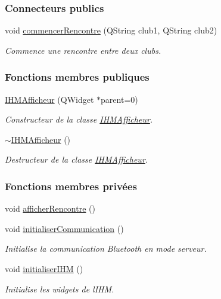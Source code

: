 \subsubsection*{Connecteurs publics}
\begin{DoxyCompactItemize}
\item 
void \hyperlink{class_i_h_m_afficheur_ad2dc0742d9cdda731a16c570fd6f2434}{commencer\+Rencontre} (Q\+String club1, Q\+String club2)
\begin{DoxyCompactList}\small\item\em Commence une rencontre entre deux clubs. \end{DoxyCompactList}\end{DoxyCompactItemize}
\subsubsection*{Fonctions membres publiques}
\begin{DoxyCompactItemize}
\item 
\hyperlink{class_i_h_m_afficheur_a2fdf6626a1d9c2c635110a6e6ab703f9}{I\+H\+M\+Afficheur} (Q\+Widget $\ast$parent=0)
\begin{DoxyCompactList}\small\item\em Constructeur de la classe \hyperlink{class_i_h_m_afficheur}{I\+H\+M\+Afficheur}. \end{DoxyCompactList}\item 
\hyperlink{class_i_h_m_afficheur_aba47ddf68f3966ed8f5c697b48e352a4}{$\sim$\+I\+H\+M\+Afficheur} ()
\begin{DoxyCompactList}\small\item\em Destructeur de la classe \hyperlink{class_i_h_m_afficheur}{I\+H\+M\+Afficheur}. \end{DoxyCompactList}\end{DoxyCompactItemize}
\subsubsection*{Fonctions membres privées}
\begin{DoxyCompactItemize}
\item 
void \hyperlink{class_i_h_m_afficheur_aec1fee14a130ea53206bf5f8e532b819}{afficher\+Rencontre} ()
\item 
void \hyperlink{class_i_h_m_afficheur_ab7a8db8e7cfa6dc86ab59a07ede75298}{initialiser\+Communication} ()
\begin{DoxyCompactList}\small\item\em Initialise la communication Bluetooth en mode serveur. \end{DoxyCompactList}\item 
void \hyperlink{class_i_h_m_afficheur_a119539fa51bf2e091e77faedf82eb146}{initialiser\+I\+HM} ()
\begin{DoxyCompactList}\small\item\em Initialise les widgets de l\textquotesingle{}I\+HM. \end{DoxyCompactList}\end{DoxyCompactItemize}

